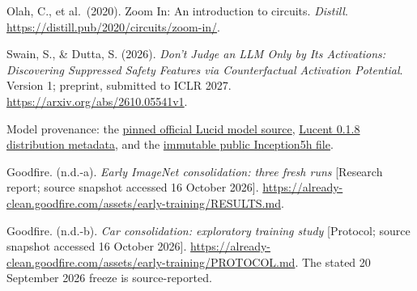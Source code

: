 \documentclass[
  british,
  11pt,
  a4paper,
]{article}
\begin{document}
Olah, C., et al.~(2020). Zoom In: An introduction to circuits.
\emph{Distill}. \url{https://distill.pub/2020/circuits/zoom-in/}.

Swain, S., \& Dutta, S. (2026). \emph{Don't Judge an LLM Only by Its
Activations: Discovering Suppressed Safety Features via Counterfactual
Activation Potential}. Version 1; preprint, submitted to ICLR 2027.
\url{https://arxiv.org/abs/2610.05541v1}.

Model provenance: the
\href{https://github.com/tensorflow/lucid/blob/6dcc927e4ff4e7ef4d9c54d27b0352849dadd1bb/lucid/modelzoo/other_models/InceptionV1.py}{pinned
official Lucid model source},
\href{https://pypi.org/pypi/torch-lucent/0.1.8/json}{Lucent 0.1.8
distribution metadata}, and the
\href{https://github.com/ProGamerGov/pytorch-old-tensorflow-models/blob/f8187b60fca8a3f5cfa541406dcbcefb80db5c78/inception5h.pth}{immutable
public Inception5h file}.

Goodfire. (n.d.-a). \emph{Early ImageNet consolidation: three fresh
runs} {[}Research report; source snapshot accessed 16 October 2026{]}.
\url{https://already-clean.goodfire.com/assets/early-training/RESULTS.md}.

Goodfire. (n.d.-b). \emph{Car consolidation: exploratory training study}
{[}Protocol; source snapshot accessed 16 October 2026{]}.
\url{https://already-clean.goodfire.com/assets/early-training/PROTOCOL.md}.
The stated 20 September 2026 freeze is source-reported.
\end{document}
